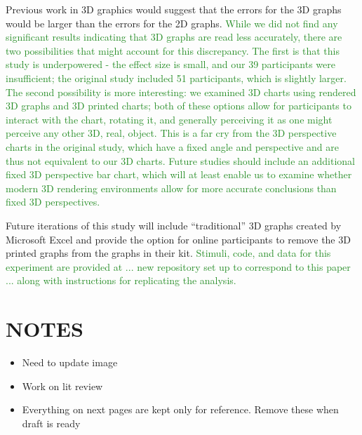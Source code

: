\documentclass[letterpaper,inpress,dvipsnames]{jdsart}
\begin{document}
Previous work in 3D graphics would suggest that the errors for the 3D graphs would be larger than the errors for the 2D graphs. {\textcolor{ForestGreen}{While we did not find any significant results indicating that 3D graphs are read less accurately, there are two possibilities that might account for this discrepancy. The first is that this study is underpowered - the effect size is small, and our 39 participants were insufficient; the original study included 51 participants, which is slightly larger. The second possibility is more interesting: we examined 3D charts using rendered 3D graphs and 3D printed charts; both of these options allow for participants to interact with the chart, rotating it, and generally perceiving it as one might perceive any other 3D, real, object. This is a far cry from the 3D perspective charts in the original study, which have a fixed angle and perspective and are thus not equivalent to our 3D charts. Future studies should include an additional fixed 3D perspective bar chart, which will at least enable us to examine whether modern 3D rendering environments allow for more accurate conclusions than fixed 3D perspectives.}}

Future iterations of this study will include ``traditional'' 3D graphs created by Microsoft Excel and provide the option for online participants to remove the 3D printed graphs from the graphs in their kit. {\textcolor{ForestGreen}{Stimuli, code, and data for this experiment are provided at ... new repository set up to correspond to this paper ... along with instructions for replicating the analysis.}}

\newpage

\hypertarget{notes}{%
\section{NOTES}\label{notes}}

\begin{itemize}
\item
  Need to update image
\item
  Work on lit review
\item
  Everything on next pages are kept only for reference. Remove these when draft is ready
\end{itemize}



\end{document}
